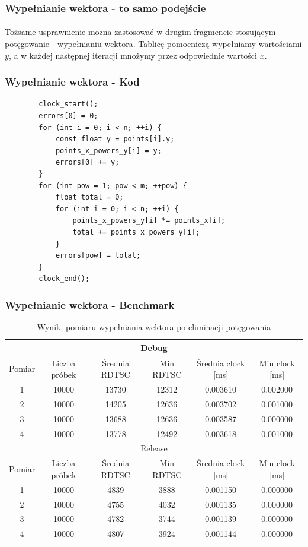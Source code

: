 \documentclass[12pt]{report}
\begin{document}
	\subsubsection{Wypełnianie wektora - to samo podejście}
	\paragraph{}
	Tożsame usprawnienie można zastosować w drugim fragmencie stosującym potęgowanie - wypełnianiu wektora. Tablicę pomocniczą wypełniamy wartościami $y$, a w każdej następnej iteracji mnożymy przez odpowiednie wartości $x$.
	
	\subsubsection{Wypełnianie wektora - Kod}
	\begin{verbatim}
		clock_start();
		errors[0] = 0;
		for (int i = 0; i < n; ++i) {
			const float y = points[i].y;
			points_x_powers_y[i] = y;
			errors[0] += y;
		}
		for (int pow = 1; pow < m; ++pow) {
			float total = 0;
			for (int i = 0; i < n; ++i) {
				points_x_powers_y[i] *= points_x[i];
				total += points_x_powers_y[i];
			}
			errors[pow] = total;
		}
		clock_end();
	\end{verbatim}
	
	\pagebreak
	\subsubsection{Wypełnianie wektora - Benchmark}
	\begin{table}
		\centering
		\caption{Wyniki pomiaru wypełniania wektora po eliminacji potęgowania}
		\begin{tabular}{|c|c|c|c|c|c|} \hline
			\multicolumn{6}{|c|}{Debug} \\\hline
			Pomiar  & Liczba próbek & Średnia RDTSC & Min RDTSC & Średnia clock [ms] & Min clock [ms] \\\hline
			1 & 10000 & 13730 & 12312 & 0.003610 & 0.002000 \\\hline
			2 & 10000 & 14205 & 12636 & 0.003702 & 0.001000 \\\hline
			3 & 10000 & 13688 & 12636 & 0.003587 & 0.000000 \\\hline
			4 & 10000 & 13778 & 12492 & 0.003618 & 0.001000 \\\hline
			\hline
			\multicolumn{6}{|c|}{Release} \\\hline
			Pomiar  & Liczba próbek & Średnia RDTSC & Min RDTSC & Średnia clock [ms] & Min clock [ms] \\\hline
			1 & 10000 & 4839 & 3888 & 0.001150 & 0.000000 \\\hline
			2 & 10000 & 4755 & 4032 & 0.001135 & 0.000000 \\\hline
			3 & 10000 & 4782 & 3744 & 0.001139 & 0.000000 \\\hline
			4 & 10000 & 4807 & 3924 & 0.001144 & 0.000000 \\\hline
		\end{tabular}
	\end{table}
	
\end{document}
